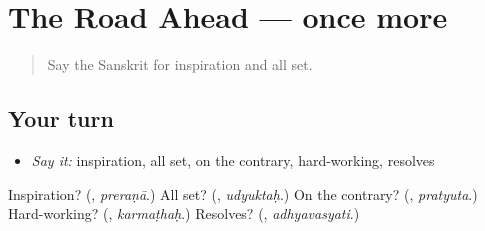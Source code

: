\section[(dialogue)]{The Road Ahead — once more}

\label{lesson:SA-R555-review-final-555}



\begin{quote}
Say the Sanskrit for inspiration and all set.
\end{quote}

\subsection*{Your turn}
\begin{itemize}
\raggedright
  \item \emph{Say it:} inspiration, all set, on the contrary, hard-working, resolves
\end{itemize}

\begin{tcolorbox}[breakable,colback=teal!4,colframe=teal!35!black,title={Before you move on}]
Inspiration? (\textbf{}, \emph{preraṇā}.) All set? (\textbf{}, \emph{udyuktaḥ}.) On the contrary? (\textbf{}, \emph{pratyuta}.) Hard-working? (\textbf{}, \emph{karmaṭhaḥ}.) Resolves? (\textbf{}, \emph{adhyavasyati}.)
\end{tcolorbox}

